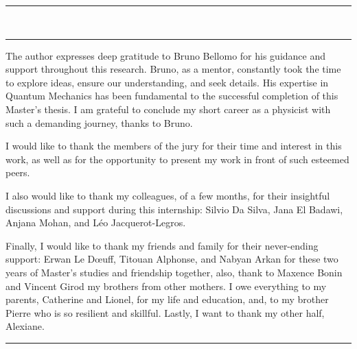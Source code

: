 \thispagestyle{empty}
\vskip 2.5mm
\noindent\rule{\textwidth}{0.8pt}\\[-3    mm]
\noindent\rule{\textwidth}{0.8pt}
\vskip 2cm
\begin{justify}
    \hspace{0.5cm}The author expresses deep gratitude to Bruno Bellomo for his guidance and support throughout this research. Bruno, as a mentor, constantly took the time to explore ideas, ensure our understanding, and seek details. His expertise in Quantum Mechanics has been fundamental to the successful completion of this Master’s thesis. I am grateful to conclude my short career as a physicist with such a demanding journey, thanks to Bruno.\par\vspace{0.15cm}\noindent
    I would like to thank the members of the jury for their time and interest in this work, as well as for the opportunity to present my work in front of such esteemed peers.\par\vspace{0.15cm}\noindent
    I also would like to thank my colleagues, of a few months, for their insightful discussions and support during this internship: Silvio Da Silva, Jana El Badawi, Anjana Mohan, and Léo Jacquerot-Legros.\par\vspace{0.15cm}\noindent
    Finally, I would like to thank my friends and family for their never-ending support: Erwan Le D{\oe}uff, Titouan Alphonse, and Nabyan Arkan for these two years of Master’s studies and friendship together, also, thank to Maxence Bonin and Vincent Girod my brothers from other mothers. I owe everything to my parents, Catherine and Lionel, for my life and education, and, to my brother Pierre who is so resilient and skillful. Lastly, I want to thank my other half, Alexiane.
\end{justify}\vspace{1cm}
\rule{0.5\textwidth}{1pt}\par
\vspace{1cm}
